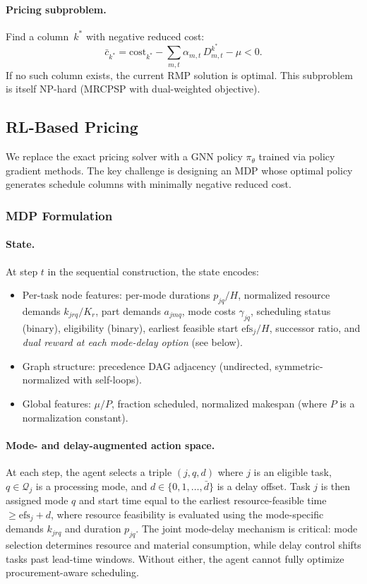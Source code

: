 \documentclass[11pt]{article}
\newcommand{\calQ}{\mathcal{Q}}
\begin{document}
\paragraph{Pricing subproblem.}
Find a column~$k^*$ with negative reduced cost:
\begin{equation}\label{eq:rc}
    \bar{c}_{k^*} = \mathrm{cost}_{k^*} - \sum_{m,t} \alpha_{m,t} \, D^{k^*}_{m,t} - \mu < 0.
\end{equation}
If no such column exists, the current RMP solution is optimal.
This subproblem is itself NP-hard (MRCPSP with dual-weighted objective).

\subsection{RL-Based Pricing}\label{sec:rl}

We replace the exact pricing solver with a GNN policy $\pi_\theta$ trained via policy gradient methods.
The key challenge is designing an MDP whose optimal policy generates schedule columns with minimally negative reduced cost.

\subsubsection{MDP Formulation}

\paragraph{State.}
At step $t$ in the sequential construction, the state encodes:
\begin{itemize}
    \item Per-task node features: per-mode durations $p_{jq} / H$, normalized resource demands $k_{jrq}/K_r$, part demands $a_{jmq}$, mode costs $\gamma_{jq}$, scheduling status (binary), eligibility (binary), earliest feasible start $\mathrm{efs}_j / H$, successor ratio, and \emph{dual reward at each mode-delay option} (see below).
    \item Graph structure: precedence DAG adjacency (undirected, symmetric-normalized with self-loops).
    \item Global features: $\mu / P$, fraction scheduled, normalized makespan (where $P$ is a normalization constant).
\end{itemize}

\paragraph{Mode- and delay-augmented action space.}
At each step, the agent selects a triple $(j, q, d)$ where $j$ is an eligible task, $q \in \calQ_j$ is a processing mode, and $d \in \{0, 1, \dots, \bar{d}\}$ is a delay offset.
Task $j$ is then assigned mode $q$ and start time equal to the earliest resource-feasible time $\geq \mathrm{efs}_j + d$, where resource feasibility is evaluated using the mode-specific demands $k_{jrq}$ and duration $p_{jq}$.
The joint mode-delay mechanism is critical: mode selection determines resource and material consumption, while delay control shifts tasks past lead-time windows.
Without either, the agent cannot fully optimize procurement-aware scheduling.
\end{document}
